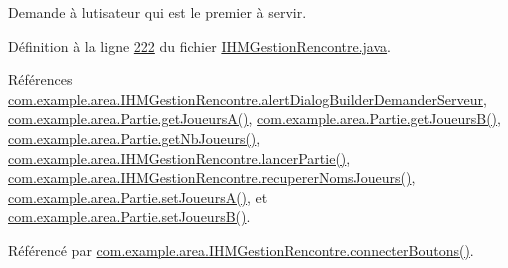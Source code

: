 Demande à l\textquotesingle{}utisateur qui est le premier à servir. 



Définition à la ligne \hyperlink{_i_h_m_gestion_rencontre_8java_source_l00222}{222} du fichier \hyperlink{_i_h_m_gestion_rencontre_8java_source}{I\+H\+M\+Gestion\+Rencontre.\+java}.



Références \hyperlink{_i_h_m_gestion_rencontre_8java_source_l00051}{com.\+example.\+area.\+I\+H\+M\+Gestion\+Rencontre.\+alert\+Dialog\+Builder\+Demander\+Serveur}, \hyperlink{_partie_8java_source_l00064}{com.\+example.\+area.\+Partie.\+get\+Joueurs\+A()}, \hyperlink{_partie_8java_source_l00072}{com.\+example.\+area.\+Partie.\+get\+Joueurs\+B()}, \hyperlink{_partie_8java_source_l00351}{com.\+example.\+area.\+Partie.\+get\+Nb\+Joueurs()}, \hyperlink{_i_h_m_gestion_rencontre_8java_source_l00311}{com.\+example.\+area.\+I\+H\+M\+Gestion\+Rencontre.\+lancer\+Partie()}, \hyperlink{_i_h_m_gestion_rencontre_8java_source_l00281}{com.\+example.\+area.\+I\+H\+M\+Gestion\+Rencontre.\+recuperer\+Noms\+Joueurs()}, \hyperlink{_partie_8java_source_l00359}{com.\+example.\+area.\+Partie.\+set\+Joueurs\+A()}, et \hyperlink{_partie_8java_source_l00367}{com.\+example.\+area.\+Partie.\+set\+Joueurs\+B()}.



Référencé par \hyperlink{_i_h_m_gestion_rencontre_8java_source_l00158}{com.\+example.\+area.\+I\+H\+M\+Gestion\+Rencontre.\+connecter\+Boutons()}.


